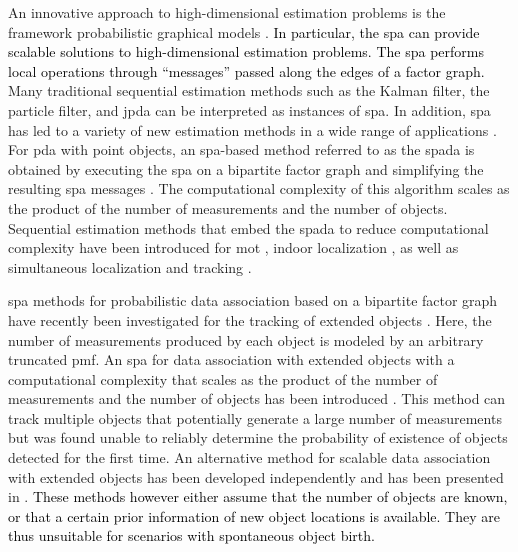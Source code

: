 \documentclass[10pt, twoside, romanappendices]{IEEEtran}
\providecommand{\rd}{\textcolor{black}}
\begin{document}
An innovative approach to high-dimensional estimation problems is the framework probabilistic graphical models \cite{KolFri:B09}. \rd{In particular, the \ac{spa} \cite{KscFreLoe:01,YedFreWei:05,KolFri:B09} can provide scalable solutions to high-dimensional estimation problems. The \ac{spa} performs local operations through ``messages'' passed along the edges of a factor graph.} Many traditional sequential estimation methods such as the Kalman filter, the particle filter, and \ac{jpda} can be interpreted as instances of  \ac{spa}. In addition, \ac{spa} has led to a variety of new estimation methods in a wide range of applications \cite{FosMihIma:J99,RicUrb:J01,MeyEtzLiuHlaWin:J18}. For \ac{pda} with point objects, an \ac{spa}-based method referred to as the \ac{spada} is obtained by executing the \ac{spa} on a bipartite factor graph and simplifying the resulting \ac{spa} messages \cite{WilLau:J14,MeyKroWilLauHlaBraWin:J18,KroMeyHla:J20}. The computational complexity of this algorithm scales as the product of the number of measurements and the number of objects. Sequential estimation methods that embed the \ac{spada} to reduce computational complexity have been introduced for \ac{mot} \cite{Wil:J15,KroMeyHla:C16,MeyBraWilHla:J17,SolMeyBraHla:J19,LauWil:C16,ZhaMey:C21}, indoor localization \cite{LeiMeyMeiWitHla:C16,LeiMeyHlaWitTufWin:J19,MenMeyBauWin:JS19,LiLeiVenTuf:J21}, as well as simultaneous localization and tracking \cite{MeyWin:C18,MeyHliHla:J16,MeyLiuWin:C18}. 

\ac{spa} methods for probabilistic data association based on a bipartite factor graph have recently been investigated for the tracking of extended objects \cite{MeyZheWin:C19,MeyWin:J20,LiWeiCheWeiZha:C21}. Here, the number of measurements produced by each object is modeled by an arbitrary truncated \ac{pmf}. An \ac{spa} for data association with extended objects with a computational complexity that scales as the product of the number of measurements and the number of objects has been introduced \cite{MeyZheWin:C19,MeyWin:J20}. This method can track multiple objects that potentially generate a large number of measurements but was found unable to reliably determine the probability of existence of objects detected for the first time. An alternative method for scalable data association with extended objects has been developed independently and has been presented \vspace{-.5mm} in \cite{YanThoBau:C18,YanWolBau:C20}. \rd{These methods however either assume that the number of objects are known, or that a certain prior information of new object locations is available. They are thus unsuitable for scenarios with spontaneous object birth.}
\end{document}
